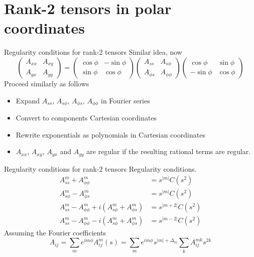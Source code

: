 \documentclass[11pt,aspectratio=169]{beamer}
\begin{document}
\section{Rank-2 tensors in polar coordinates}
\begin{frame}{Regularity conditions for rank-2 tensors}
	Similar idea, now
	\[
    \begin{pmatrix} A_{xx} & A_{xy} \\ A_{yx} & A_{yy} \end{pmatrix} = 
    \begin{pmatrix} \cos\phi & -\sin\phi \\ \sin\phi & \cos\phi \end{pmatrix}
    \begin{pmatrix} A_{ss} & A_{s\phi} \\ A_{\phi s} & A_{\phi\phi} \end{pmatrix}
    \begin{pmatrix} \cos\phi & \sin\phi \\ -\sin\phi & \cos\phi \end{pmatrix}
	\]
	Proceed similarly as follows
	\begin{itemize}
		\item Expand $A_{ss}$, $A_{s\phi}$, $A_{\phi s}$, $A_{\phi\phi}$ in Fourier series
		\item Convert to components Cartesian coordinates
		\item Rewrite exponentials as polynomials in Cartesian coordinates
		\item $A_{xx}$, $A_{xy}$, $A_{yx}$ and $A_{yy}$ are regular if the resulting rational terms are regular.
	\end{itemize}
\end{frame}

\begin{frame}{Regularity conditions for rank-2 tensors}
	Regularity conditions.
	\[
		\begin{aligned}
			A_{ss}^m + A_{\phi\phi}^m &= s^{|m|} C(s^2) \\ 
			A_{s\phi}^m - A_{\phi s}^m &= s^{|m|} C(s^2) \\ 
			A_{ss}^m - A_{\phi\phi}^m + i \left(A_{s\phi}^m + A_{\phi s}^m\right) &= s^{|m+2|} C(s^2) \\ 
			A_{ss}^m - A_{\phi\phi}^m - i \left(A_{s\phi}^m + A_{\phi s}^m\right) &= s^{|m-2|} C(s^2)
		\end{aligned}
	\]
	Assuming the Fourier coefficients
	\[A_{ij} = \sum_m e^{im\phi} A_{ij}^{m}(s) = \sum_m e^{im\phi} s^{|m|+\Delta_m} \sum_k A_{ij}^{mk} s^{2k}\]
\end{frame}
\end{document}
